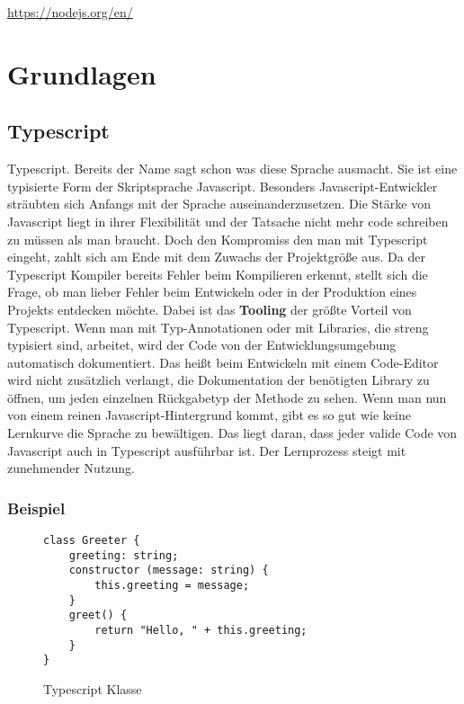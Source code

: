 \begin{center}
\url{https://nodejs.org/en/}
\end{center}

\section{Grundlagen}

\subsection{Typescript}
Typescript. Bereits der Name sagt schon was diese Sprache ausmacht. Sie ist eine typisierte Form der Skriptsprache Javascript. Besonders Javascript-Entwickler sträubten sich Anfangs mit der Sprache auseinanderzusetzen. Die Stärke von Javascript liegt in ihrer Flexibilität und der Tatsache nicht mehr code schreiben zu müssen als man braucht. Doch den Kompromiss den man mit Typescript eingeht, zahlt sich am Ende mit dem Zuwachs der Projektgröße aus. Da der Typescript Kompiler bereits Fehler beim Kompilieren erkennt, stellt sich die Frage, ob man lieber Fehler beim Entwickeln oder in der Produktion eines Projekts entdecken möchte. Dabei ist das \textbf{Tooling} der größte Vorteil von Typescript. Wenn man mit Typ-Annotationen oder mit Libraries, die streng typisiert sind, arbeitet, wird der Code von der Entwicklungsumgebung automatisch dokumentiert. Das heißt beim Entwickeln mit einem Code-Editor wird nicht zusätzlich verlangt, die Dokumentation der benötigten Library zu öffnen, um jeden einzelnen Rückgabetyp der Methode zu sehen. Wenn man nun von einem reinen Javascript-Hintergrund kommt, gibt es so gut wie keine Lernkurve die Sprache zu bewältigen. Das liegt daran, dass jeder valide Code von Javascript auch in Typescript ausführbar ist. Der Lernprozess steigt mit zunehmender Nutzung.

\subsubsection{Beispiel}

\begin{figure}[H]
\begin{lstlisting}[basicstyle=\small]
class Greeter {
    greeting: string;
    constructor (message: string) {
        this.greeting = message;
    }
    greet() {
        return "Hello, " + this.greeting;
    }
}  
\end{lstlisting}
\caption{Typescript Klasse \cite{typescript-example}}
\end{figure}

